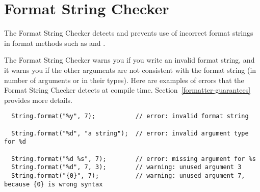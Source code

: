 \htmlhr
\chapter{Format String Checker\label{formatter-checker}}

\begin{sloppypar}
The Format String Checker detects and prevents use of incorrect format strings
in format methods such as 
and .
\end{sloppypar}

The Format String Checker warns you if you write an invalid format string,
and it warns you if the other arguments are not consistent with the format
string (in number of arguments or in their types).  Here are examples of
errors that the Format String Checker detects at compile time.
Section~\ref{formatter-guarantees} provides more details.



% 
%

\begin{Verbatim}
  String.format("%y", 7);           // error: invalid format string

  String.format("%d", "a string");  // error: invalid argument type for %d

  String.format("%d %s", 7);        // error: missing argument for %s
  String.format("%d", 7, 3);        // warning: unused argument 3
  String.format("{0}", 7);          // warning: unused argument 7, because {0} is wrong syntax
\end{Verbatim}


